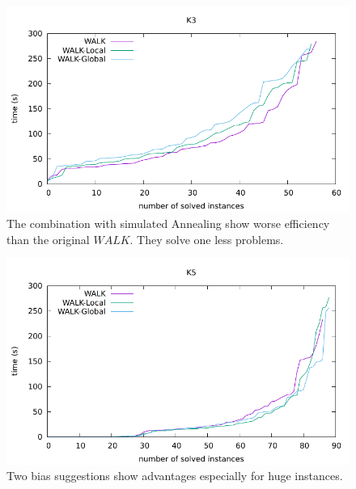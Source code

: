 \documentclass[12pt,a4paper,twoside]{scrartcl}
\numberwithin{equation}{section}
\begin{document}
\begin{figure}[H]
\begin{center}
  \includegraphics[scale = 1]{DATA/K3/e3w.pdf}
  \end{center}
  \caption{The combination with simulated Annealing show worse efficiency than the original $WALK$. They solve one less problems. }
  \label{Experiment 3 k3-w cactus plot}
  \end{figure}
  \begin{figure}[H]
\begin{center}
  \includegraphics[scale = 1]{DATA/K5/e3w.pdf}
  \end{center}
  \caption{Two bias suggestions show advantages especially for huge instances.}
  \label{Experiment 3 k5-w cactus plot}
  \end{figure}
\end{document}
